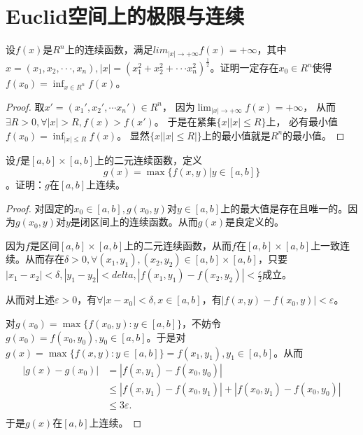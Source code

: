 \section{Euclid空间上的极限与连续}

    \begin{exercise}
  设$f(x)$是$R^n$上的连续函数，满足$lim_{|x|\rightarrow+\infty}f(x)=+\infty$，其中$x=(x_1,x_2,\cdot\cdot\cdot,x_n),|x|=(x_1^2+x_2^2+\cdot\cdot\cdot x_n^2)^{\frac12}$。证明一定存在$x_0\in R^n$使得$f(x_0)=\inf_{x\in R^n}f(x)$。%
    \end{exercise}

    \begin{proof}
	取$x'=(x_1',x_2',\cdots x_n')\in R^n$，
  因为$\lim_{|x|\rightarrow+\infty}f(x)=+\infty$，
  从而$\exists R>0,\forall|x|>R,f(x)>f(x')$。
  于是在紧集$\{x||x|\leq R\}$上，
  必有最小值$f(x_0)=\inf_{|x|\leq R}f(x)$。
  显然$\{x||x|\leq R|\}$上的最小值就是$R^n$的最小值。
	\end{proof}

	\begin{exercise}
  设$f$是$[a,b]\times[a,b]$上的二元连续函数，定义$$g(x)=\max\{f(x,y)|y\in[a,b]\}$$。证明：$g$在$[a,b]$上连续。%
	\end{exercise}
	
	\begin{proof}
	对固定的$x_0\in[a,b],g(x_0,y)$对$y\in[a,b]$上的最大值是存在且唯一的。因为$g(x_0,y)$对$y$是闭区间上的连续函数。从而$g(x)$是良定义的。
	
	因为$f$是区间$[a,b]\times[a,b]$上的二元连续函数，从而$f$在$[a,b]\times[a,b]$上一致连续。从而存在$\delta>0,\forall(x_1,y_1),(x_2,y_2)\in[a,b]\times[a,b]$，只要$|x_1-x_2|<\delta,|y_1-y_2|<delta,|f(x_1,y_1)-f(x_2,y_2)|<\frac{\varepsilon}{2}$成立。
	
	从而对上述$\varepsilon>0$，有$\forall|x-x_0|<\delta,x\in[a,b]$，有$|f(x,y)-f(x_0,y)|<\varepsilon$。
	
	对$g(x_0)=\max\{f(x_0,y):y\in[a,b]\}$，不妨令$g(x_0)=f(x_0,y_0),y_0\in[a,b]$。于是对$g(x)=\max\{f(x,y):y\in[a,b]\}=f(x_1,y_1),y_1\in[a,b]$。从而
	$$
	\begin{aligned}
	|g(x)-g(x_0)|&=|f(x,y_1)-f(x_0,y_0)|\\
	&\leq|f(x,y_1)-f(x_0,y_1)|+|f(x_0,y_1)-f(x_0,y_0)|\\
	&\leq3\varepsilon.\\
	\end{aligned}
	$$
	于是$g(x)$在$[a,b]$上连续。
	\end{proof}
	
